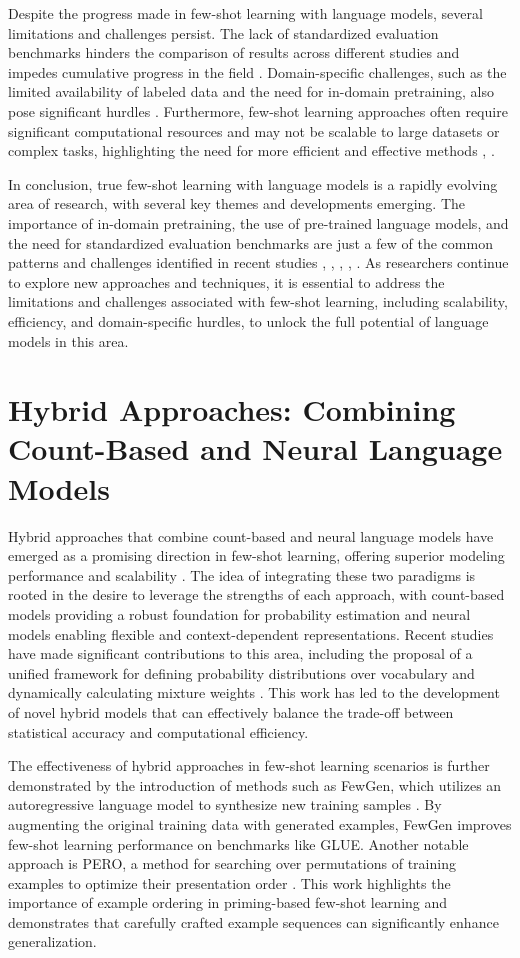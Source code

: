 \documentclass[conference]{IEEEtran}
\begin{document}
Despite the progress made in few-shot learning with language models, several limitations and challenges persist. The lack of standardized evaluation benchmarks hinders the comparison of results across different studies and impedes cumulative progress in the field \cite{b4}. Domain-specific challenges, such as the limited availability of labeled data and the need for in-domain pretraining, also pose significant hurdles \cite{b2}. Furthermore, few-shot learning approaches often require significant computational resources and may not be scalable to large datasets or complex tasks, highlighting the need for more efficient and effective methods \cite{b1}, \cite{b3}.

In conclusion, true few-shot learning with language models is a rapidly evolving area of research, with several key themes and developments emerging. The importance of in-domain pretraining, the use of pre-trained language models, and the need for standardized evaluation benchmarks are just a few of the common patterns and challenges identified in recent studies \cite{b1}, \cite{b2}, \cite{b3}, \cite{b4}, \cite{b5}. As researchers continue to explore new approaches and techniques, it is essential to address the limitations and challenges associated with few-shot learning, including scalability, efficiency, and domain-specific hurdles, to unlock the full potential of language models in this area.

\section{Hybrid Approaches: Combining Count-Based and Neural Language Models}
Hybrid approaches that combine count-based and neural language models have emerged as a promising direction in few-shot learning, offering superior modeling performance and scalability \cite{b1}. The idea of integrating these two paradigms is rooted in the desire to leverage the strengths of each approach, with count-based models providing a robust foundation for probability estimation and neural models enabling flexible and context-dependent representations. Recent studies have made significant contributions to this area, including the proposal of a unified framework for defining probability distributions over vocabulary and dynamically calculating mixture weights \cite{b2}. This work has led to the development of novel hybrid models that can effectively balance the trade-off between statistical accuracy and computational efficiency.

The effectiveness of hybrid approaches in few-shot learning scenarios is further demonstrated by the introduction of methods such as FewGen, which utilizes an autoregressive language model to synthesize new training samples \cite{b3}. By augmenting the original training data with generated examples, FewGen improves few-shot learning performance on benchmarks like GLUE. Another notable approach is PERO, a method for searching over permutations of training examples to optimize their presentation order \cite{b4}. This work highlights the importance of example ordering in priming-based few-shot learning and demonstrates that carefully crafted example sequences can significantly enhance generalization.
\end{document}
